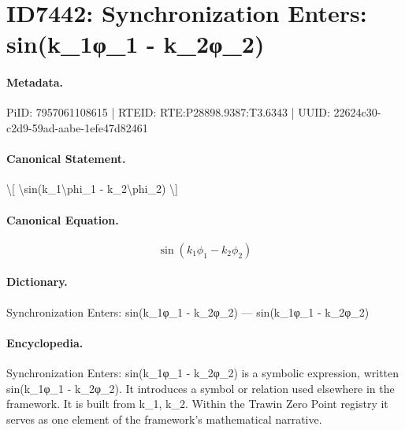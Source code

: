 \section*{ID7442: Synchronization Enters: sin(k\_1φ\_1 - k\_2φ\_2)}
\paragraph{Metadata.}
PiID: 7957061108615 | RTEID: RTE:P28898.9387:T3.6343 | UUID: 22624c30-c2d9-59ad-aabe-1efe47d82461

\paragraph{Canonical Statement.}
\textbackslash{}[ \textbackslash{}sin(k\_1\textbackslash{}phi\_1 - k\_2\textbackslash{}phi\_2) \textbackslash{}]

\paragraph{Canonical Equation.}
\[
\sin(k_1\phi_1 - k_2\phi_2)
\]

\paragraph{Dictionary.}
Synchronization Enters: sin(k\_1φ\_1 - k\_2φ\_2) — sin(k\_1φ\_1 - k\_2φ\_2)

\paragraph{Encyclopedia.}
Synchronization Enters: sin(k\_1φ\_1 - k\_2φ\_2) is a symbolic expression, written sin(k\_1φ\_1 - k\_2φ\_2). It introduces a symbol or relation used elsewhere in the framework. It is built from k\_1, k\_2. Within the Trawin Zero Point registry it serves as one element of the framework's mathematical narrative.
